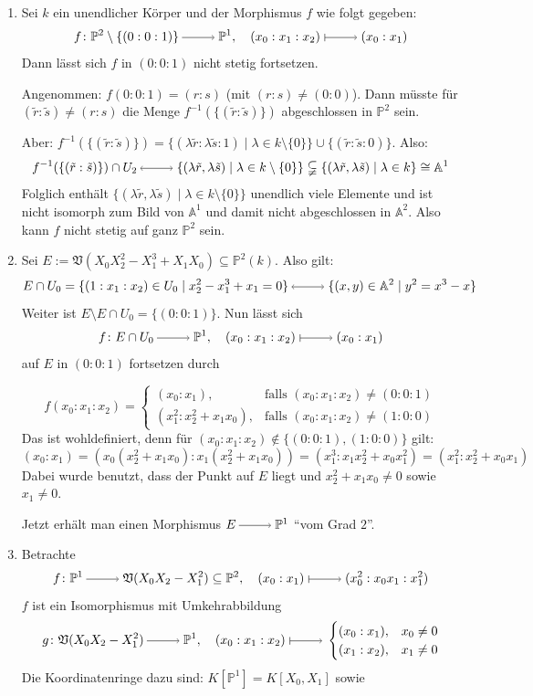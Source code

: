 \documentclass[a4paper,12pt]{scrbook}
\theoremstyle{keinenummern} %
\theoremstyle{mitnummern}
\theoremstyle{unserbeweis}
\def\A{\mathbb{A}}
\def\V{\mathfrak{V}}
\def\P{\mathbb{P}}
\newcommand{\ra}{\raisebox{-1pt}{\tikz{\draw[thin,shorten >=3pt, ->] (0,0) node{\hspace*{-2pt}} -- node{} (1,0);}}\penalty1000\relax}
\renewcommand{\mapsto}{\raisebox{-1pt}{\tikz{\draw[thin,shorten >=3pt, |->] (0,0) node{\hspace*{0pt}} -- node{} (1,0);}}\penalty1000\relax}
\newcommand{\lra}{\raisebox{-1pt}{\tikz{\draw[thin,shorten >=3pt, <->] (0,0) node{\hspace*{-2pt}} -- node{} (1,0);}}\penalty1000\relax}
\begin{document}
\begin{bsp}\label{2.6.3}
\begin{enumerate}
  \item{} Sei $k$ ein unendlicher Körper und der Morphismus $f$ wie folgt gegeben:
\[f\colon \P^2\setminus \{(0:0:1)\}\ra \P^1, \quad (x_0:x_1:x_2)\mapsto (x_0:x_1)\]
Dann lässt sich $f$ in $(0:0:1)$ nicht stetig fortsetzen.

Angenommen: $f(0:0:1)=(r:s)$ (mit $(r:s)\neq (0:0)$). Dann müsste für $(\tilde{r}:\tilde{s})\neq (r:s)$ die Menge $f^{-1}(\{(\tilde{r}:\tilde{s})\})$ abgeschlossen in $\P^2$ sein.

Aber: $f^{-1}(\{(\tilde{r}:\tilde{s})\})=\{(\lambda \tilde{r}:\lambda \tilde{s}:1) \mid \lambda \in k\setminus \{0\}\}\cup\{(\tilde{r}:\tilde{s}:0)\}$. Also:
\[f^{-1}(\{(\tilde{r}:\tilde{s})\})\cap U_2 \lra \{(\lambda \tilde{r},\lambda \tilde{s}) \mid \lambda \in k\setminus \{0\}\} \subsetneqq \{(\lambda \tilde{r},\lambda \tilde{s}) \mid \lambda \in k\} \cong \A^1\]
Folglich enthält $\{(\lambda \tilde{r}, \lambda \tilde{s}) \mid \lambda \in k\setminus \{0\}\}$ unendlich viele Elemente und ist nicht isomorph zum Bild von $\A^1$ und damit nicht abgeschlossen in $\A^2$. Also kann $f$ nicht stetig auf ganz $\P^2$ sein.
  \item{} Sei $E:=\V(X_0X_2^2-X_1^3+X_1X_0) \subseteq \P^2(k)$. Also gilt: 
  \[E\cap U_0=\{(1:x_1:x_2) \in U_0 \mid x_2^2-x_1^3+x_1=0\} \lra \{(x,y)\in \A^2 \mid y^2=x^3-x\}\]
Weiter ist $E\setminus E\cap U_0=\{(0:0:1)\}$. Nun lässt sich 
\[f \colon E\cap U_0\ra \P^1, \quad (x_0:x_1:x_2)\mapsto (x_0:x_1)\] auf $E$ in $(0:0:1)$ fortsetzen durch 

\[f(x_0:x_1:x_2)=\begin{cases} (x_0:x_1),&\text{falls } (x_0:x_1:x_2)\neq (0:0:1)\\ (x_1^2:x_2^2+x_1x_0),&\text{falls } (x_0:x_1:x_2)\neq (1:0:0) \end{cases}\] 
Das ist wohldefiniert, denn für $(x_0:x_1:x_2) \notin \{(0:0:1),(1:0:0)\}$ gilt:
\[(x_0:x_1)=(x_0(x_2^2+x_1x_0):x_1(x_2^2+x_1x_0))=(x_1^3:x_1x_2^2+x_0x_1^2)=(x_1^2:x_2^2+x_0x_1)\]
Dabei wurde benutzt, dass der Punkt auf $E$ liegt und $x_2^2+x_1x_0 \neq 0$ sowie $x_1 \neq 0$.

Jetzt erhält man einen Morphismus $E\ra \P^1$ \enquote{vom Grad $2$}.
  \item{} Betrachte
\[f\colon \P^1\ra \V(X_0X_2-X_1^2)\subseteq \P^2, \quad (x_0:x_1)\mapsto (x_0^2:x_0x_1:x_1^2)\]
$f$ ist ein Isomorphismus mit Umkehrabbildung
\[g\colon\V(X_0X_2-X_1^2)\ra \P^1, \quad (x_0:x_1:x_2)\mapsto \begin{cases} (x_0:x_1), &x_0 \neq 0\\(x_1:x_2), &x_1 \neq 0 \end{cases} \]
Die Koordinatenringe dazu sind: $K[\P^1]=K[X_0,X_1]$ sowie


\end{enumerate}
\end{bsp}
\end{document}
